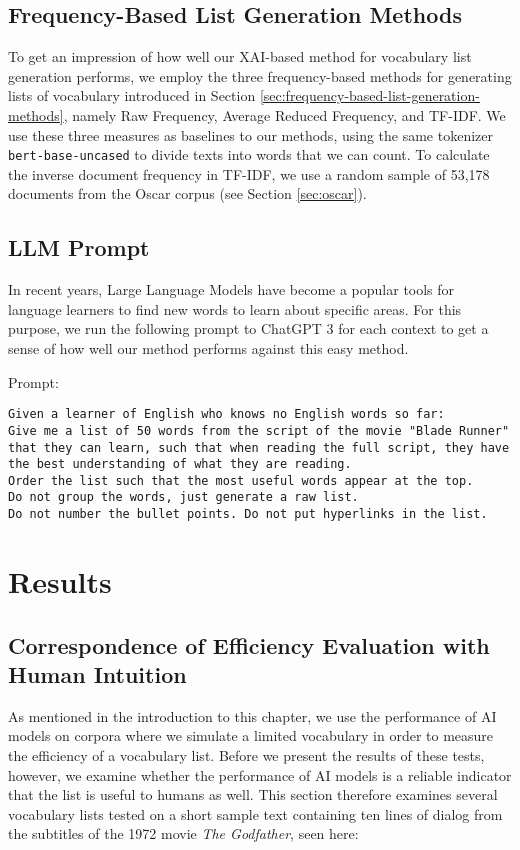 \subsection{Frequency-Based List Generation Methods}
To get an impression of how well our XAI-based method for vocabulary list generation performs, we employ the three frequency-based methods for generating lists of vocabulary introduced in Section \ref{sec:frequency-based-list-generation-methods}, namely Raw Frequency, Average Reduced Frequency, and TF-IDF.
We use these three measures as baselines to our methods, using the same tokenizer \texttt{bert-base-uncased} to divide texts into words that we can count.
To calculate the inverse document frequency in TF-IDF, we use a random sample of 53,178 documents from the Oscar corpus (see Section \ref{sec:oscar}).


\subsection{LLM Prompt}
In recent years, Large Language Models have become a popular tools for language learners to find new words to learn about specific areas.
For this purpose, we run the following prompt to ChatGPT 3 for each context to get a sense of how well our method performs against this easy method.

Prompt:

\begin{lstlisting}[caption={Prompt given to the language model.}, label={lst:blade_runner_prompt}, captionpos=b]
	Given a learner of English who knows no English words so far:
Give me a list of 50 words from the script of the movie "Blade Runner" that they can learn, such that when reading the full script, they have the best understanding of what they are reading.
Order the list such that the most useful words appear at the top.
Do not group the words, just generate a raw list.
Do not number the bullet points. Do not put hyperlinks in the list.

\end{lstlisting}

\section{Results} \label{sec:results}

\subsection{Correspondence of Efficiency Evaluation with Human Intuition}
As mentioned in the introduction to this chapter, we use the performance of AI models on corpora where we simulate a limited vocabulary in order to measure the efficiency of a vocabulary list.
Before we present the results of these tests, however, we examine whether the performance of AI models is a reliable indicator that the list is useful to humans as well.
This section therefore examines several vocabulary lists tested on a short sample text containing ten lines of dialog from the subtitles of the 1972 movie \textit{The Godfather}, seen here:

